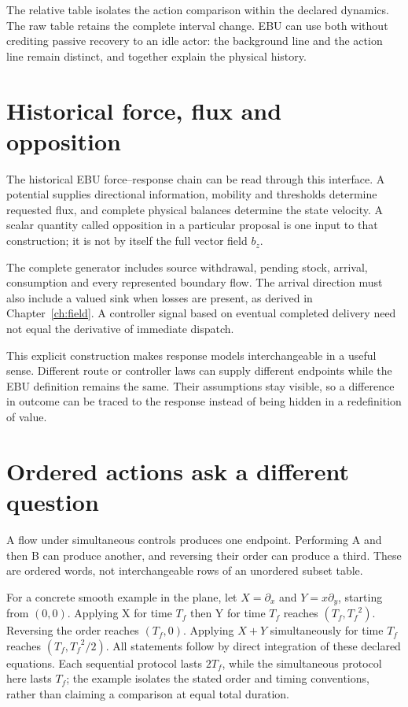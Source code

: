 The relative table isolates the action comparison within the declared dynamics. The raw table retains the complete interval change. EBU can use both without crediting passive recovery to an idle actor: the background line and the action line remain distinct, and together explain the physical history.

\section{Historical force, flux and opposition}
The historical EBU force--response chain can be read through this interface. A potential supplies directional information, mobility and thresholds determine requested flux, and complete physical balances determine the state velocity. A scalar quantity called opposition in a particular proposal is one input to that construction; it is not by itself the full vector field $b_z$.

The complete generator includes source withdrawal, pending stock, arrival, consumption and every represented boundary flow. The arrival direction must also include a valued sink when losses are present, as derived in Chapter~\ref{ch:field}. A controller signal based on eventual completed delivery need not equal the derivative of immediate dispatch.

This explicit construction makes response models interchangeable in a useful sense. Different route or controller laws can supply different endpoints while the EBU definition remains the same. Their assumptions stay visible, so a difference in outcome can be traced to the response instead of being hidden in a redefinition of value.

\section{Ordered actions ask a different question}
A flow under simultaneous controls produces one endpoint. Performing A and then B can produce another, and reversing their order can produce a third. These are ordered words, not interchangeable rows of an unordered subset table.

For a concrete smooth example in the plane, let $X=\partial_x$ and $Y=x\partial_y$, starting from $(0,0)$. Applying X for time ${T_f}$ then Y for time ${T_f}$ reaches $({T_f},{T_f}^2)$. Reversing the order reaches $({T_f},0)$. Applying $X+Y$ simultaneously for time ${T_f}$ reaches $({T_f},{T_f}^2/2)$. All statements follow by direct integration of these declared equations. Each sequential protocol lasts $2T_f$, while the simultaneous protocol here lasts $T_f$; the example isolates the stated order and timing conventions, rather than claiming a comparison at equal total duration.

